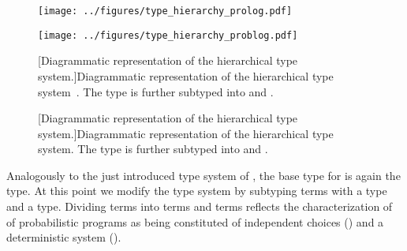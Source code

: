 \begin{figure}[h!]
	\centering
	\begin{minipage}{.45\textwidth}
		\centering
		\texttt{[image: ../figures/type\_hierarchy\_prolog.pdf]}
	\end{minipage}%
	\hfill
	\begin{minipage}{.45\textwidth}
		\centering
		\texttt{[image: ../figures/type\_hierarchy\_problog.pdf]}
	\end{minipage}
	\par
	\medskip
	\noindent
	\begin{minipage}[t]{.45\textwidth}
		[Diagrammatic representation of the hierarchical \prologsty type system.]{Diagrammatic representation of the hierarchical \prologsty type system~\citep{sterling1994art}. The  type is further subtyped into  and .}
		\label{fig:type_system_prolog}
	\end{minipage}%
	\hfill
	\begin{minipage}[t]{.45\textwidth}
		[Diagrammatic representation of the hierarchical \problogsty type system.]{Diagrammatic representation of the hierarchical \problogsty type system. The  type is further subtyped into  and .}
		\label{fig:type_system_problog}
	\end{minipage}
\end{figure}



Analogously to the just introduced type system of \problogsty, the base type for \dcproblogsty is again the  type. At this point we modify the \problogsty type system by subtyping terms with a  type and a  type. 
Dividing \dcproblogsty terms into  terms and  terms reflects the characterization of~\citet{poole2010probabilistic} of probabilistic programs as being constituted of independent choices () and a deterministic system ().


